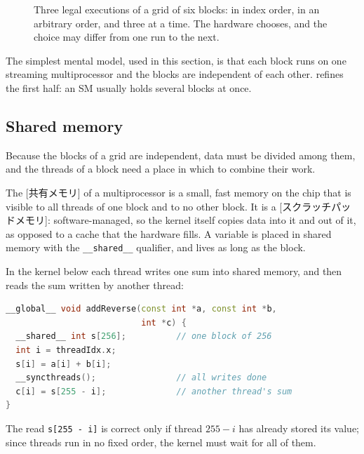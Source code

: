 \documentclass[../main.tex]{subfiles}
\begin{document}
\begin{figure}[tb]
  \centering
  
  \caption{Three legal executions of a grid of six blocks: in index order,
    in an arbitrary order, and three at a time.  The hardware chooses,
    and the choice may differ from one run to the next.}
  \label{fig:l03-block-order}
\end{figure}

The simplest mental model, used in this section, is that each block runs
on one streaming multiprocessor and the blocks are independent of each
other.   refines the first half: an SM usually
holds several blocks at once.

\subsection{Shared memory}

Because the blocks of a grid are independent, data must be divided among
them, and the threads of a block need a place in which to combine their
work.

\begin{definition}
  The [共有メモリ] of a multiprocessor is a small,
  fast memory on the chip that is visible to all threads of one block and
  to no other block.  It is a [スクラッチパッドメモリ]:
  software-managed, so the kernel itself copies data into it and out of
  it, as opposed to a cache that the hardware fills.  A variable is placed
  in shared memory with the \texttt{\_\_shared\_\_} qualifier, and lives
  as long as the block.
\end{definition}

In the kernel below each thread writes one sum into shared memory, and
then reads the sum written by another thread:
\begin{lstlisting}[language=C++, numbers=none]
__global__ void addReverse(const int *a, const int *b,
                           int *c) {
  __shared__ int s[256];          // one block of 256
  int i = threadIdx.x;
  s[i] = a[i] + b[i];
  __syncthreads();                // all writes done
  c[i] = s[255 - i];              // another thread's sum
}
\end{lstlisting}
The read \texttt{s[255 - i]} is correct only if thread $255-i$ has
already stored its value; since threads run in no fixed order, the
kernel must wait for all of them.
\end{document}
